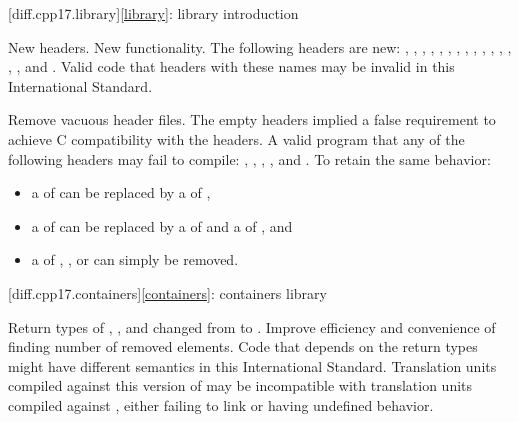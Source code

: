[diff.cpp17.library]{\ref{library}: library introduction}

\change
New headers.
\rationale
New functionality.
\effect
The following \Cpp{} headers are new:
,
,
,
,
,
,
,
,
,
,
,
,
,
,
, and
.
Valid \CppXVII{} code that  headers with these names may be
invalid in this International Standard.

\change
Remove vacuous \Cpp{} header files.
\rationale
The empty headers implied a false requirement to achieve C compatibility with the \Cpp{} headers.
\effect
A valid \CppXVII{} program that  any of the following headers may fail to compile:
,
,
,
, and
.
To retain the same behavior:
\begin{itemize}
\item
a  of  can be replaced by
a  of ,
\item
a  of  can be replaced by
a  of  and
a  of ,
and
\item
a  of
,
, or
can simply be removed.
\end{itemize}

[diff.cpp17.containers]{\ref{containers}: containers library}

\change
Return types of , , and 
changed from  to .
\rationale
Improve efficiency and convenience of finding number of removed elements.
\effect
Code that depends on the return types might have different semantics in this International Standard.
Translation units compiled against this version of \Cpp{} may be incompatible with
translation units compiled against \CppXVII{}, either failing to link or having undefined behavior.

